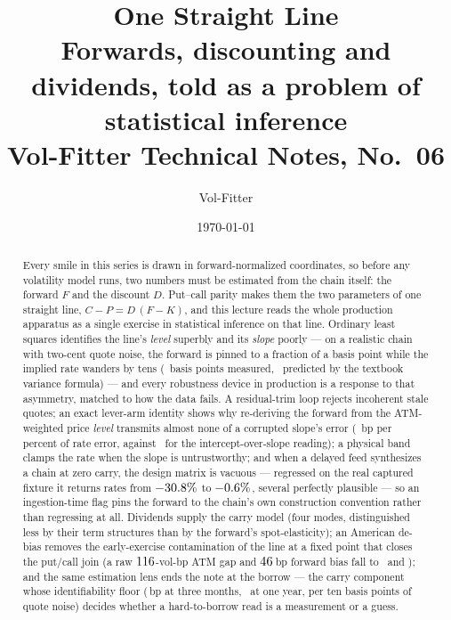 \documentclass[11pt]{article}
\title{\textbf{One Straight Line}\\[2pt]
\large Forwards, discounting and dividends, told as a problem of
statistical inference\\[2pt]
\normalsize Vol-Fitter Technical Notes, No.~06}
\author{Vol-Fitter}
\date{\today}
\begin{document}
\maketitle




\begin{abstract}
Every smile in this series is drawn in forward-normalized coordinates, so
before any volatility model runs, two numbers must be estimated from the
chain itself: the forward $F$ and the discount $D$.  Put--call parity makes
them the two parameters of one straight line, $C-P=D\,(F-K)$, and this
lecture reads the whole production apparatus as a single exercise in
statistical inference on that line.  Ordinary least squares identifies the
line's \emph{level} superbly and its \emph{slope} poorly --- on a realistic
chain with two-cent quote noise, the forward is pinned to a fraction of a
basis point while the implied rate wanders by tens
(\fwdinfmcratesd\ basis points measured, \fwdinfmcratepred\ predicted by
the textbook variance formula) --- and every robustness
device in production is a response to that asymmetry, matched to how the
data fails.  A residual-trim loop rejects incoherent stale quotes; an
exact lever-arm identity shows why re-deriving the forward from the
ATM-weighted price \emph{level} transmits almost none of a corrupted
slope's error (\fwdinfleverkern\ bp per percent of rate error, against
\fwdinflevernaive\ for the intercept-over-slope reading); a physical band
clamps the rate when the slope is untrustworthy; and when a delayed feed
synthesizes a chain at zero carry, the design matrix is vacuous ---
regressed on the real captured fixture it returns rates from
$-30.8\%$ to $-0.6\%$, several perfectly plausible
--- so an ingestion-time flag pins the forward to the chain's own
construction convention rather than regressing at all.  Dividends supply
the carry model (four modes, distinguished less by their term structures
than by the forward's spot-elasticity); an American de-bias removes the
early-exercise contamination of the line at a fixed point that closes the
put/call join (a raw $116$-vol-bp ATM gap and
$46$\,bp forward bias fall to \fwdinfdebgap\ and
\fwdinfdebbp); and the same estimation lens ends the note at the borrow
--- the carry component whose identifiability floor
(\fwdinfbfloorq\,bp at three months, \fwdinfbfloory\ at one year, per ten
basis points of quote noise) decides whether a hard-to-borrow read is a
measurement or a guess.
\end{abstract}
\end{document}
